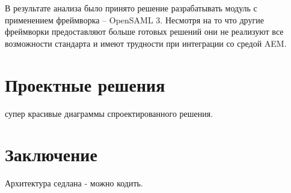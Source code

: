 В результате анализа было принято решение разрабатывать модуль с применением фреймворка – OpenSAML 3. Несмотря на то что другие фреймворки предоставляют больше готовых решений они не реализуют все возможности стандарта и имеют трудности при интеграции со средой AEM.

\section{Проектные решения}
супер красивые диаграммы спроектированного решения.

\section{Заключение}
Архитектура седлана - можно кодить.

